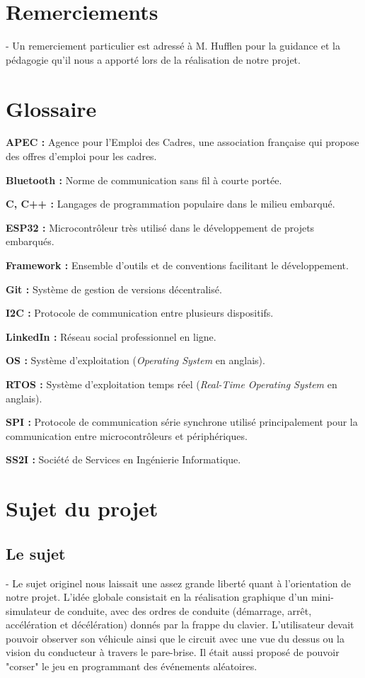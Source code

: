 \documentclass[a4paper,12pt]{report}
\begin{document}
\newpage
\section*{Remerciements}
- Un remerciement particulier est adressé à M. Hufflen pour la guidance et la pédagogie qu'il nous a apporté lors de la réalisation de notre projet.

\newpage
\tableofcontents
\newpage


\newpage
\section*{Glossaire}

\textbf{APEC :} Agence pour l'Emploi des Cadres, une association française qui propose des offres d'emploi pour les cadres.

\textbf{Bluetooth :} Norme de communication sans fil à courte portée.

\textbf{C, C++ :} Langages de programmation populaire dans le milieu embarqué.

\textbf{ESP32 :} Microcontrôleur très utilisé dans le développement de projets embarqués.

\textbf{Framework :} Ensemble d'outils et de conventions facilitant le développement.

\textbf{Git :} Système de gestion de versions décentralisé.

\textbf{I2C :} Protocole de communication entre plusieurs dispositifs.

\textbf{LinkedIn :} Réseau social professionnel en ligne.

\textbf{OS :} Système d'exploitation (\textit{Operating System} en anglais).

\textbf{RTOS :} Système d'exploitation temps réel (\textit{Real-Time Operating System} en anglais).

\textbf{SPI :} Protocole de communication série synchrone utilisé principalement pour la communication entre microcontrôleurs et périphériques.

\textbf{SS2I :} Société de Services en Ingénierie Informatique.

\newpage
\section{Sujet du projet}

\subsection{Le sujet}
- Le sujet originel nous laissait une assez grande liberté quant à l'orientation de notre projet. L'idée globale consistait en la réalisation graphique d'un mini-simulateur de conduite, avec des ordres de conduite (démarrage, arrêt, accélération et décélération) donnés par la frappe du clavier. L'utilisateur devait pouvoir observer son véhicule ainsi que le circuit avec une vue du dessus ou la vision du conducteur à travers le pare-brise. Il était aussi proposé de pouvoir "corser" le jeu en programmant des événements aléatoires.
\end{document}
